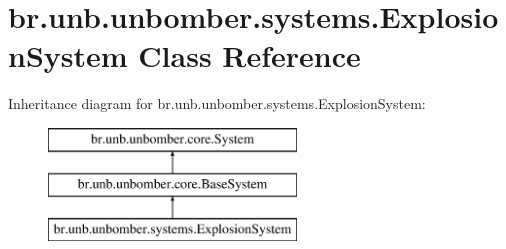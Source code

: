\hypertarget{classbr_1_1unb_1_1unbomber_1_1systems_1_1_explosion_system}{\section{br.\+unb.\+unbomber.\+systems.\+Explosion\+System Class Reference}
\label{classbr_1_1unb_1_1unbomber_1_1systems_1_1_explosion_system}
}
Inheritance diagram for br.\+unb.\+unbomber.\+systems.\+Explosion\+System\+:\begin{figure}[H]
\begin{center}
\leavevmode
\includegraphics[height=3.000000cm]{classbr_1_1unb_1_1unbomber_1_1systems_1_1_explosion_system}
\end{center}
\end{figure}
